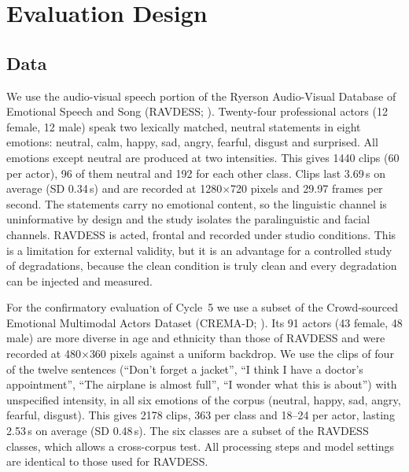 \section{Evaluation Design}\label{sec:evaluation}

\subsection{Data}

We use the audio-visual speech portion of the Ryerson Audio-Visual Database of Emotional Speech and Song (RAVDESS; \citealp{livingstone2018}). Twenty-four professional actors (12 female, 12 male) speak two lexically matched, neutral statements in eight emotions: neutral, calm, happy, sad, angry, fearful, disgust and surprised. All emotions except neutral are produced at two intensities. This gives 1440 clips (60 per actor), 96 of them neutral and 192 for each other class. Clips last 3.69\,s on average (SD 0.34\,s) and are recorded at 1280$\times$720 pixels and 29.97 frames per second. The statements carry no emotional content, so the linguistic channel is uninformative by design and the study isolates the paralinguistic and facial channels. RAVDESS is acted, frontal and recorded under studio conditions. This is a limitation for external validity, but it is an advantage for a controlled study of degradations, because the clean condition is truly clean and every degradation can be injected and measured.

For the confirmatory evaluation of Cycle~5 we use a subset of the Crowd-sourced Emotional Multimodal Actors Dataset (CREMA-D; \citealp{cao2014}). Its 91 actors (43 female, 48 male) are more diverse in age and ethnicity than those of RAVDESS and were recorded at 480$\times$360 pixels against a uniform backdrop. We use the clips of four of the twelve sentences (``Don't forget a jacket'', ``I think I have a doctor's appointment'', ``The airplane is almost full'', ``I wonder what this is about'') with unspecified intensity, in all six emotions of the corpus (neutral, happy, sad, angry, fearful, disgust). This gives 2178 clips, 363 per class and 18--24 per actor, lasting 2.53\,s on average (SD 0.48\,s). The six classes are a subset of the RAVDESS classes, which allows a cross-corpus test. All processing steps and model settings are identical to those used for RAVDESS.


